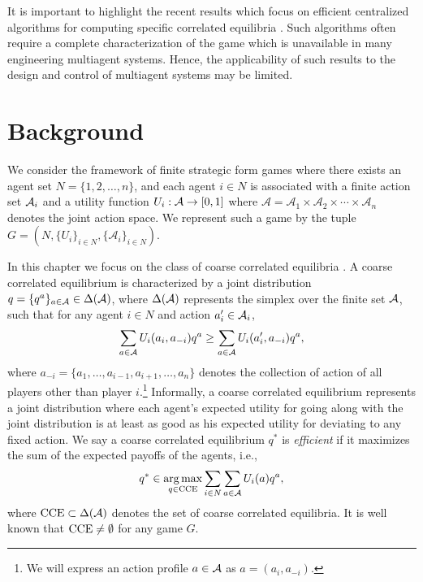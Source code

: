 It is important to highlight the recent results which focus on efficient centralized algorithms for computing specific correlated equilibria \cite{Jiang2011, Papadimitriou2008, Ortiz}.  Such algorithms often require  a complete characterization of the game which is unavailable in many engineering multiagent systems.  Hence, the applicability of such results to the design and control of multiagent systems may be limited.  


\section{Background}

We consider the framework of finite strategic form games where there exists an agent set $N = \{1, 2, \dots, n\}$, and each agent $i \in N$ is associated with a finite action set ${\cal A}_i$ and a utility function $U_i : {\cal A} \rightarrow [0,1]$ where $\mathcal{A} = \mathcal{A}_1\times\mathcal{A}_2\times\cdots\times \mathcal{A}_n$ denotes the joint action space. %
%
%
We  represent such a game by the tuple $G = \left (N,\{U_i\}_{i\in N},\{\mathcal{A}_i\}_{i\in N}\right)$.

In this chapter we focus on the class of coarse correlated equilibria \cite{Aumann1987}.  A coarse correlated equilibrium is characterized by a joint distribution $q = \{q^a\}_{a \in {\cal A}} \in \Delta({\cal A})$, where $\Delta({\cal A})$ represents the simplex over the finite set ${\cal A}$, such that for any agent $i \in N$ and action $a_i' \in {\cal A}_i$,
%
\begin{equation} 
\sum_{a \in {\cal A}} U_i(a_i, a_{-i}) q^a \geq \sum_{a \in {\cal A}} U_i(a_i', a_{-i}) q^a, 
\end{equation}
%
where $a_{-i} = \{a_1, \dots, a_{i-1}, a_{i+1}, \dots, a_n\}$ denotes the collection of action of all players other than player $i$.\footnote{We will express an action profile $a \in {\cal A}$ as $a=(a_i, a_{-i})$.}  Informally, a coarse correlated equilibrium represents a joint distribution where each agent's expected utility for going along with the joint distribution is at least as good as his expected utility for deviating to any fixed action.  We say a coarse correlated equilibrium $q^*$ is {\it efficient} if it maximizes the sum of the expected payoffs of the agents, i.e., 
%
\begin{equation}
%
q^* \in \underset{q \in {\rm CCE}}{\arg \max} \sum_{i \in N} \sum_{a \in \aee} U_i(a) q^a,
%
\end{equation}  
%
where ${\rm CCE} \subset \Delta({\cal A})$ denotes the set of coarse correlated equilibria.  It is well known that ${\rm CCE} \neq \emptyset$ for any game $G$.

